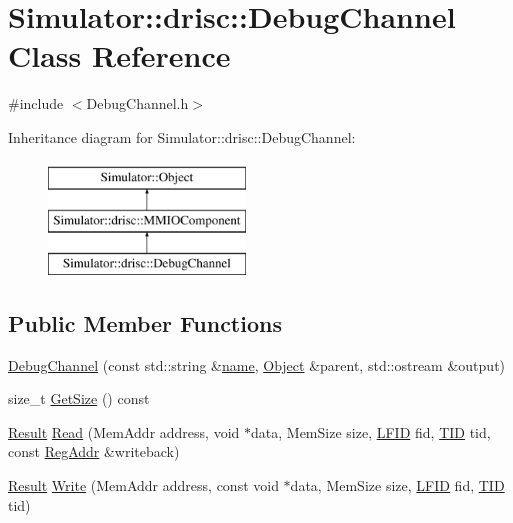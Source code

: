 \hypertarget{class_simulator_1_1drisc_1_1_debug_channel}{\section{Simulator\+:\+:drisc\+:\+:Debug\+Channel Class Reference}
\label{class_simulator_1_1drisc_1_1_debug_channel}
}


{\ttfamily \#include $<$Debug\+Channel.\+h$>$}

Inheritance diagram for Simulator\+:\+:drisc\+:\+:Debug\+Channel\+:\begin{figure}[H]
\begin{center}
\leavevmode
\includegraphics[height=3.000000cm]{class_simulator_1_1drisc_1_1_debug_channel}
\end{center}
\end{figure}
\subsection*{Public Member Functions}
\begin{DoxyCompactItemize}
\item 
\hyperlink{class_simulator_1_1drisc_1_1_debug_channel_aaeca18839cded092f43be7dce8c5112d}{Debug\+Channel} (const std\+::string \&\hyperlink{mtconf_8c_a8f8f80d37794cde9472343e4487ba3eb}{name}, \hyperlink{class_simulator_1_1_object}{Object} \&parent, std\+::ostream \&output)
\item 
size\+\_\+t \hyperlink{class_simulator_1_1drisc_1_1_debug_channel_abd636bf58c008ee82af796b6a0091801}{Get\+Size} () const 
\item 
\hyperlink{namespace_simulator_a4b6b5616e7236c0c131516a441776805}{Result} \hyperlink{class_simulator_1_1drisc_1_1_debug_channel_af772c686411b277669040f139d684fb7}{Read} (Mem\+Addr address, void $\ast$data, Mem\+Size size, \hyperlink{namespace_simulator_aaccbc706b2d6c99085f52f6dfc2333e4}{L\+F\+I\+D} fid, \hyperlink{namespace_simulator_a483cc4ecee1736e895054617672cded5}{T\+I\+D} tid, const \hyperlink{struct_simulator_1_1_reg_addr}{Reg\+Addr} \&writeback)
\item 
\hyperlink{namespace_simulator_a4b6b5616e7236c0c131516a441776805}{Result} \hyperlink{class_simulator_1_1drisc_1_1_debug_channel_aea26d20ae29dcf23154ef4072a108bfe}{Write} (Mem\+Addr address, const void $\ast$data, Mem\+Size size, \hyperlink{namespace_simulator_aaccbc706b2d6c99085f52f6dfc2333e4}{L\+F\+I\+D} fid, \hyperlink{namespace_simulator_a483cc4ecee1736e895054617672cded5}{T\+I\+D} tid)
\end{DoxyCompactItemize}



